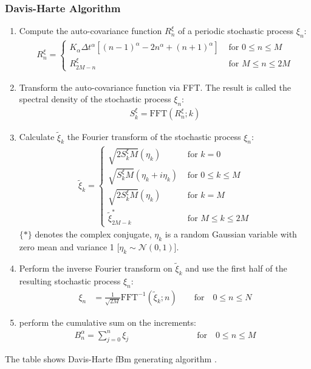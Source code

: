 \documentclass[
  a4paper,BCOR10mm,oneside,
  headsepline,footsepline,%
  fleqn,openbib
]{scrbook}
\begin{document}
\subsubsection{Davis-Harte Algorithm}
\begin{table}[h!]
 \begin{framed}
\begin{enumerate}
 \item Compute the auto-covariance function $R^{\xi}_n$ of a periodic stochastic process $\xi_n$:
 \begin{align}
  R^{\xi}_n= 
  \begin{cases}
    K_{\alpha} \Delta t^{\alpha}\left[(n-1)^{\alpha}-2n^{\alpha}+(n+1)^{\alpha}\right] & \text{ for    } 0 \leq n \leq M \\
   R^{\xi}_{2M-n}  & \text{ for    } M \leq n \leq 2M 
  \end{cases}
 \end{align}
 \item Transform the auto-covariance function via FFT. The result is called the spectral density of the stochastic process $\xi_n$:
  \begin{align}
   S^{\xi}_k= \mathrm{FFT}(R^{\xi}_n;k)
  \end{align}
 \item Calculate $\tilde\xi_k$ the Fourier transform of the stochastic process $\xi_n$:
 \begin{align}
  \tilde\xi_k=
  \begin{cases}
     \sqrt{2 S^{\xi}_k M}(\eta_k) & \text{ for    } k=0 \\    
     \sqrt{ S^{\xi}_k M}(\eta_k+i \eta_k)  & \text{ for    } 0 \leq k \leq M \\
     \sqrt{2 S^{\xi}_k M}(\eta_k)  & \text{ for    } k = M \\
     \tilde\xi^{*}_{2M-k} & \text{ for    } M \leq k \leq 2M 
  \end{cases}
 \end{align}
 $\{*\}$ denotes the complex conjugate, $\eta_k$ is a random Gaussian variable with zero mean and variance 1 [$\eta_k\sim \mathcal{N}(0,1)$].  
 \item Perform the inverse Fourier transform on $\tilde\xi_k$ and use the first half of the resulting stochastic process $\xi_n$:
 \begin{align}
  \xi_n&=\frac{1}{\sqrt{2 M}} \mathrm{FFT}^{-1}(\tilde\xi_k;n) \qquad \text{for} \quad 0 \leq n \leq N
 \end{align}
 \item perform the cumulative sum on the increments:
 \begin{align}
  B^{\alpha}_n=\sum^n_{j=0} \xi_j \qquad \qquad \qquad \qquad \text{for} \quad 0 \leq n \leq M
 \end{align}
\end{enumerate}
\end{framed}
\caption{The table shows Davis-Harte fBm generating algorithm \cite{DAVIES1987}.}
\label{Davies_harte-algorithm}
\end{table}
\end{document}
